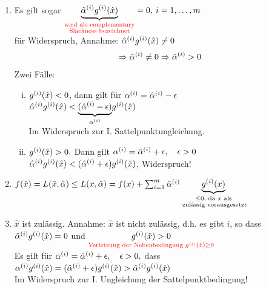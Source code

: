 			
			\begin{enumerate}
				\item Es gilt sogar $ \underset{\textcolor{red}{\substack{\text{wird als complementary} \\ \text{Slackness bezeichnet} }}}{\underbrace{\hat{\alpha}^{(i)}g^{(i)}(\hat{x})}} = 0, \medspace i = 1,\dots,m$ \\
				
				für Widerspruch, Annahme: $ \hat{\alpha}^{(i)}g^{(i)}(\hat{x}) \neq 0 $\\
				\[ \Rightarrow \hat{\alpha}^{(i)} \neq 0 \Rightarrow \hat{\alpha}^{(i)} > 0 \]
				Zwei Fälle:
				\begin{enumerate}[i)]
					\item $ g^{(i)}(\hat{x}) < 0 $, dann gilt für $ \alpha^{(i)}= \hat{\alpha}^{(i)} - \epsilon$\\
					
						$ \hat{\alpha}^{(i)}g^{(i)} (\hat{x}) < \underset{\alpha^{(i)}}{\underbrace{(\hat{\alpha}^{(i)}- \epsilon)}}g^{(i)}(\hat{x})$\\
						
						Im Widerspruch zur I. Sattelpunktungleichung.
					\item$ g^{(i)}(\hat{x})  > 0.$ Dann gilt $ \alpha^{(i)} = \hat{\alpha}^{(i)} + \epsilon, \quad\epsilon>0 $\\
					
						$ \hat{\alpha}^{(i)}g^{(i)}(\hat{x}) < (\hat{\alpha}^{(i)}+ \epsilon)g^{(i)}(\hat{x}) $, Widerspruch!
				\end{enumerate}
				
				\item $ f(\hat{x})= L(\hat{x},\hat{\alpha}) \leq L(x,\hat{\alpha}) = f(x) + \sum_{i = 1}^{m} \hat{\alpha}^{(i)} \underset{\substack{\leq 0, \text{ da } x\text{ als}\\ \text{ zulässig vorausgesetzt}}}{\underbrace{g^{(i)}(x)}}$
				
				\item $ \hat{x} $ ist zulässig. Annahme: $ \hat{x} $ ist nicht zulässig, d.h. es gibt $ i $, so dass $ \hat{\alpha}^{(i)}g^{(i)}(\hat{x}) = 0$ und $ \underset{\textcolor{red}{\text{Verletzung der Nebenbedingung  }g^{(i)}(\hat{x}) \geq 0 }}{g^{(i)}(\hat{x}) > 0}$\\
				
				Es gilt für $ \alpha^{(i)} = \hat{\alpha}^{(i)} + \epsilon, \quad \epsilon > 0,$ dass $ \alpha^{(i)} g^{(i)}(\hat{x}) = (\hat{\alpha}^{(i)} + \epsilon) g^{(i)}(\hat{x})> \hat{\alpha}^{(i)}g^{(i)}(\hat{x})$\\
				
				Im Widerspruch zur I. Ungleichung der Sattelpunktbedingung!
			\end{enumerate}
			
